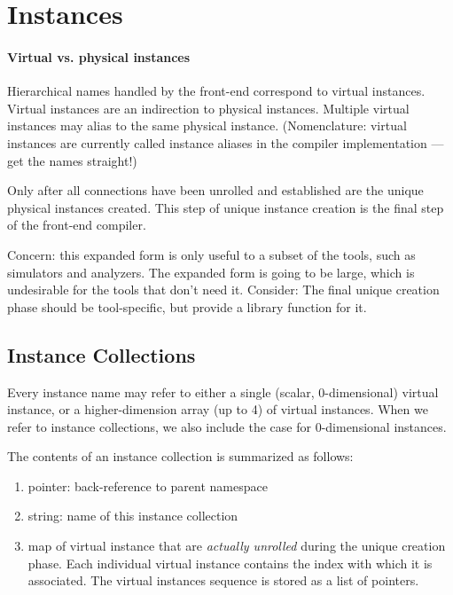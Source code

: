 
\chapter{Instances}
\label{sec:instance}

\subsubsection{Virtual vs. physical instances}

Hierarchical names handled by the front-end correspond to virtual instances.  
Virtual instances are an indirection to physical instances.  
Multiple virtual instances may alias to the same physical instance.  
(Nomenclature: virtual instances are currently called instance aliases
	in the compiler implementation --- get the names straight!)

Only after all connections have been unrolled and established are the 
unique physical instances created.  
This step of unique instance creation is the final step of the 
front-end compiler.  

Concern: this expanded form is only useful to a subset of the tools, 
such as simulators and analyzers.  
The expanded form is going to be large, which is undesirable for 
the tools that don't need it.  
Consider: The final unique creation phase should be tool-specific, 
but provide a library function for it.  

\section{Instance Collections}
\label{sec:instance:collection}

Every instance name may refer to either a single (scalar, 0-dimensional)
virtual instance, or a higher-dimension array (up to 4) of virtual instances.  
When we refer to instance collections, we also include the case for
0-dimensional instances.  

The contents of an instance collection is summarized as follows:

\begin{enumerate}
\item pointer: back-reference to parent namespace
\item string: name of this instance collection
\item map of virtual instance that are 
	\emph{actually unrolled} during the unique creation phase.  
	Each individual virtual instance contains
	the index with which it is associated.
	The virtual instances sequence is stored as a list of pointers.  
\end{enumerate}

